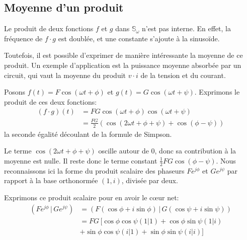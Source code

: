 \subsection{Moyenne d'un produit}

Le produit de deux fonctions $f$ et $g$ dans $\mathbb{S}_\omega$
n'est pas interne.
En effet, la fréquence de $f \cdot g$ est doublée,
et une constante s'ajoute à la sinusoïde.

Toutefois, il est possible d'exprimer de manière intéressante
la moyenne de ce produit.
Un exemple d'application est la puissance moyenne absorbée par un circuit,
qui vaut la moyenne du produit $v\cdot i$ de la tension et du courant.

Posons $f(t) = F\cos(\omega t + \phi)$ et $g(t) = G\cos(\omega t + \psi)$.
Exprimons le produit de ces deux fonctions:
\begin{equation}
    \begin{split}
        (f\cdot g)(t) &= FG\cos(\omega t + \phi)\cos(\omega t + \psi) \\
        &= \frac{FG}{2}(\cos(2\omega t + \phi + \psi) + \cos(\phi - \psi))
    \end{split}
\end{equation}
la seconde égalité découlant de la formule de Simpson.

Le terme $\cos(2\omega t + \phi + \psi)$ oscille autour de 0,
donc sa contribution à la moyenne est nulle.
Il reste donc le terme constant $\frac{1}{2}FG\cos(\phi - \psi)$.
Nous reconnaissons ici la forme du produit scalaire des phaseurs
$Fe^{j\phi}$ et $Ge^{j\psi}$ par rapport à la base orthonormée $(1,i)$,
divisée par deux.

Exprimons ce produit scalaire pour en avoir le cœur net:
\begin{equation}
    \begin{split}
        (Fe^{j\phi} \,|\, Ge^{j\psi})
        &= (F(\cos\phi+i\sin\phi) \,|\, G(\cos\psi+i\sin\psi)) \\
        &= FG\,\big[\cos\phi\cos\psi(1|1) + \cos\phi\sin\psi(1|i) \\
        &+ \sin\phi\cos\psi(i|1) + \sin\phi\sin\psi(i|i)\big]
    \end{split}
\end{equation}
